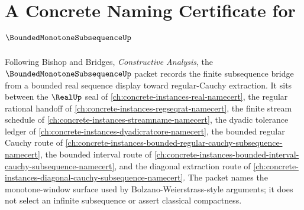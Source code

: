 \chapter{A Concrete Naming Certificate for $\BoundedMonotoneSubsequenceUp$}
\label{ch:concrete-instances-bounded-monotone-subsequence-namecert}

Following Bishop and Bridges, \emph{Constructive Analysis}, the $\BoundedMonotoneSubsequenceUp$ packet records the finite subsequence bridge from a bounded real sequence display toward regular-Cauchy extraction. It sits between the $\RealUp$ seal of \autoref{ch:concrete-instances-real-namecert}, the regular rational handoff of \autoref{ch:concrete-instances-regseqrat-namecert}, the finite stream schedule of \autoref{ch:concrete-instances-streamname-namecert}, the dyadic tolerance ledger of \autoref{ch:concrete-instances-dyadicratcore-namecert}, the bounded regular Cauchy route of \autoref{ch:concrete-instances-bounded-regular-cauchy-subsequence-namecert}, the bounded interval route of \autoref{ch:concrete-instances-bounded-interval-cauchy-subsequence-namecert}, and the diagonal extraction route of \autoref{ch:concrete-instances-diagonal-cauchy-subsequence-namecert}. The packet names the monotone-window surface used by Bolzano-Weierstrass-style arguments; it does not select an infinite subsequence or assert classical compactness.

